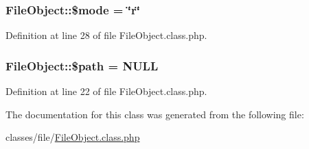 \hypertarget{classFileObject_aa4cff8a1b117de6986c0765ae2284dab}{
\subsubsection[{\$mode}]{\setlength{\rightskip}{0pt plus 5cm}File\-Object\-::\$mode = \char`\"{}r\char`\"{}}}\label{classFileObject_aa4cff8a1b117de6986c0765ae2284dab}


Definition at line 28 of file File\-Object.\-class.\-php.

\hypertarget{classFileObject_aeaea5fd423f0c1349ad151f7da63f0e8}{
\subsubsection[{\$path}]{\setlength{\rightskip}{0pt plus 5cm}File\-Object\-::\$path = N\-U\-L\-L}}\label{classFileObject_aeaea5fd423f0c1349ad151f7da63f0e8}


Definition at line 22 of file File\-Object.\-class.\-php.



The documentation for this class was generated from the following file\-:\begin{DoxyCompactItemize}
\item 
classes/file/\hyperlink{FileObject_8class_8php}{File\-Object.\-class.\-php}\end{DoxyCompactItemize}
